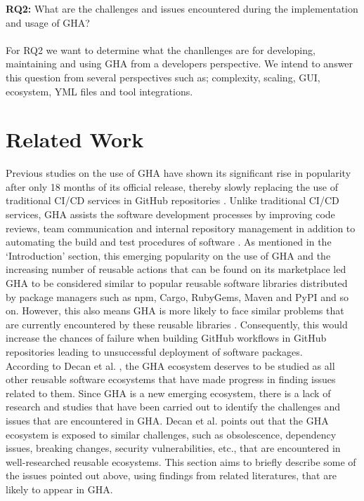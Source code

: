 \documentclass[conference]{IEEEtran}
\begin{document}
     \textbf{RQ2:} What are the challenges and issues encountered during the implementation and usage of GHA?\\
\\
For RQ2 we want to determine what the chanllenges are for developing, maintaining and using GHA from a developers perspective. We intend to answer this question from several perspectives such as; complexity, scaling, GUI, ecosystem, YML files and tool integrations.


\section{Related Work}
Previous studies on the use of GHA have shown its significant rise in popularity after only 18 months of its official release, thereby slowly replacing the use of traditional CI/CD services in GitHub repositories \cite{b15}. Unlike traditional CI/CD services, GHA assists the software development processes by improving code reviews, team communication and internal repository management in addition to automating the build and test procedures of software \cite{b16}. As mentioned in the ‘Introduction’ section, this emerging popularity on the use of GHA and the increasing number of reusable actions that can be found on its marketplace led GHA to be considered similar to popular reusable software libraries distributed by package managers such as npm, Cargo, RubyGems, Maven and PyPI and so on. However, this also means GHA is more likely to face similar problems that are currently encountered by these reusable libraries \cite{b4}. Consequently, this would increase the chances of failure when building GitHub workflows in GitHub repositories leading to unsuccessful deployment of software packages. 
\\

According to Decan et al. \cite{b4}, the GHA ecosystem deserves to be studied as all other reusable software ecosystems that have made progress in finding issues related to them. Since GHA is a new emerging ecosystem, there is a lack of research and studies that have been carried out to identify the challenges and issues that are encountered in GHA. Decan et al. \cite{b4} points out that the GHA ecosystem is exposed to similar challenges, such as obsolescence, dependency issues, breaking changes, security vulnerabilities, etc., that are encountered in well-researched reusable ecosystems. This section aims to briefly describe some of the issues pointed out above, using findings from related literatures, that are likely to appear in GHA.
\end{document}
